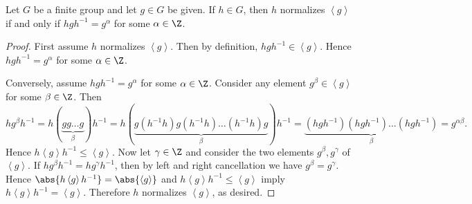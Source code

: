 \documentclass[10pt]{amsart}
\begin{document}
\begin{lem}\label{normal}
  Let $G$ be a finite group and let $g \in G$ be given.  
  If $h \in G$, then $h$ normalizes $\left<g\right>$ if and only if $hgh^{-1} = g^\alpha$ for some $\alpha \in \Z$.
  
  \begin{proof}
    First assume $h$ normalizes $\left<g\right>$.
    Then by definition, $hgh^{-1} \in \left<g\right>$.
    Hence $hgh^{-1} = g^\alpha$ for some $\alpha \in \Z$.
    
    Conversely, assume $hgh^{-1} = g^\alpha$ for some $\alpha \in \Z$.
    Consider any element $g^\beta \in \left< g \right>$ for some $\beta \in \Z$.
    Then $$hg^\beta h^{-1} = h(\underbrace{gg \ldots g}_{\beta}) h^{-1} = h(\underbrace{g(h^{-1}h)g(h^{-1}h) \ldots (h^{-1}h)g}_{\beta}) h^{-1} = \underbrace{(hgh^{-1})(hgh^{-1})\ldots (hgh^{-1})}_{\beta} = g^{\alpha\beta}.$$
    Hence $h\left<g\right>h^{-1} \leq \left<g\right>$.
    Now let $\gamma \in \Z$ and consider the two elements $g^\beta, g^\gamma$ of $\left<g\right>$.
    If $hg^\beta h^{-1} = hg^\gamma h^{-1}$, then by left and right cancellation we have $g^\beta = g^\gamma$.
    Hence $\abs{h\left<g\right>h^{-1}} = \abs{\left<g\right>}$ and $h\left<g\right>h^{-1} \leq \left<g\right>$ imply $h\left<g\right>h^{-1} = \left<g\right>$.
    Therefore $h$ normalizes $\left<g\right>$, as desired.
  \end{proof}
\end{lem}
\end{document}
